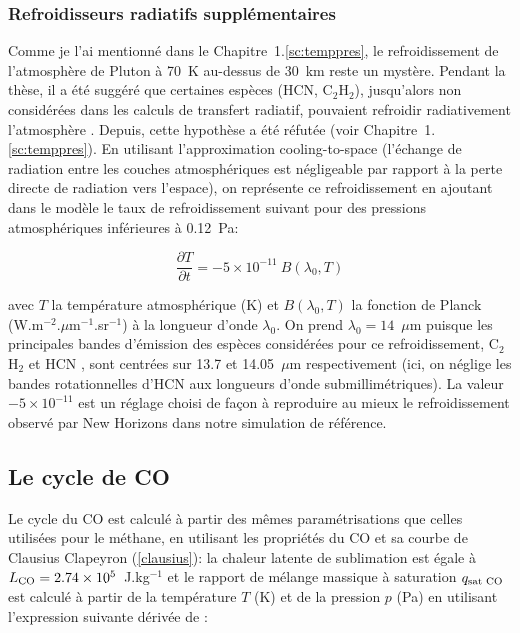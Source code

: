 \subsubsection{Refroidisseurs radiatifs supplémentaires}

Comme je l’ai mentionné dans le Chapitre~1.\ref{sc:temppres}, le refroidissement de l’atmosphère de Pluton à 70~K au-dessus de 30~km reste un mystère. Pendant la thèse, il a été suggéré que certaines espèces (HCN, C$_2$H$_2$), jusqu’alors non considérées dans les calculs de transfert radiatif, pouvaient refroidir radiativement l’atmosphère \citep{Dias:15,Glad:16}. Depuis, cette hypothèse a été réfutée (voir Chapitre~1.\ref{sc:temppres}). En utilisant l’approximation cooling-to-space (l’échange de radiation entre les couches atmosphériques est négligeable par rapport à la perte directe de radiation  vers l’espace), on représente ce refroidissement en ajoutant dans le modèle le taux de refroidissement suivant pour des pressions atmosphériques inférieures à 0.12~Pa:

\begin{equation}
\frac{\partial T}{\partial t} = -5\times10^{-11} \   B(\lambda_0,T) 
\end{equation}

avec $T$ la température atmosphérique (K) et $B(\lambda_0,T)$ la fonction de Planck (W.m$^{-2}$.$\mu$m$^{-1}$.sr$^{-1}$) à la longueur d’onde $\lambda_0$. On prend $\lambda_0 = 14$~$\mu$m puisque les principales bandes d’émission des espèces considérées pour ce refroidissement, C$_2$H$_2$ et HCN \citep{Glad:16}, sont centrées sur 13.7 et 14.05~$\mu$m respectivement (ici, on néglige les bandes rotationnelles d’HCN aux longueurs d’onde submillimétriques). La valeur $-5\times10^{-11}$ est un réglage choisi de façon à reproduire au mieux le refroidissement observé par New Horizons dans notre simulation de référence.  

\subsection{Le cycle de CO}
Le cycle du CO est calculé à partir des mêmes paramétrisations que celles utilisées pour le méthane, en utilisant les propriétés du CO et sa courbe de Clausius Clapeyron (\autoref{clausius}): la chaleur latente de sublimation est égale à $L_{\mbox{\scriptsize CO}} = 2.74\times10^5$~J.kg$^{-1}$ et le rapport de mélange massique à saturation $q_{\mbox{\scriptsize  sat CO}}$ est calculé à partir de la température $T$ (K) et de la pression $p$ (Pa) en utilisant l’expression suivante dérivée de \citet{FraySchm:09}:

